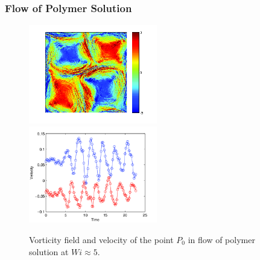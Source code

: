\begin{frame}
  \frametitle{Flow of Polymer Solution}
\begin{figure}[ht]
\includegraphics[width=0.5\textwidth]{img/polymer_loc-12.png}
\includegraphics[width=0.5\textwidth]{img/polymer_loc-7.png}
\caption{Vorticity field and velocity of the point $P_0$ in flow of polymer solution at $Wi\approx5$.}
\label{fug:vor_pol5}
\end{figure}
\end{frame}

